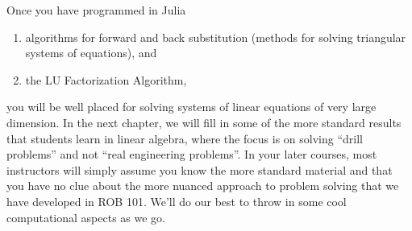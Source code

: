 Once you have programmed in Julia 
\begin{enumerate}
\renewcommand{\labelenumi}{(\alph{enumi})}
\setlength{\itemsep}{.2cm}
    \item  algorithms for forward and back substitution (methods for solving triangular systems of equations), and 
    \item  the LU Factorization Algorithm, 
\end{enumerate}
you will be well placed for solving systems of linear equations of very large dimension. In the next chapter, we will fill in some of the more standard results that students learn in linear algebra, where the focus is on solving ``drill problems'' and not ``real engineering problems''.  In your later courses, most instructors will simply assume you know the more standard material and that you have no clue about the more nuanced approach to problem solving that we have developed in ROB 101. We'll do our best to throw in some cool computational aspects as we go.\\


